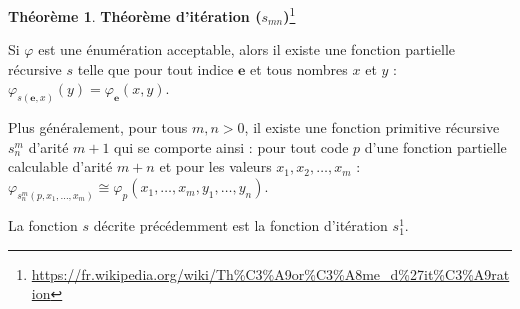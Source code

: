 \documentclass{book}
\theoremstyle{definition}
\newtheorem{theorem}{Théorème}
\numberwithin{lemma}{subsection}
\numberwithin{theorem}{subsection}
\numberwithin{definition}{subsection}
\numberwithin{proposition}{subsection}
\numberwithin{corollary}{subsection}
\numberwithin{property}{subsection}
\numberwithin{example}{subsection}
\numberwithin{heuristique}{subsection}
\numberwithin{scenario}{subsection}
\begin{document}
            \begin{theorem}\textbf{Théorème d'itération ($s_{mn}$)}\footnote{\url{https://fr.wikipedia.org/wiki/Th\%C3\%A9or\%C3\%A8me\_d\%27it\%C3\%A9ration}}\label{th:iteration}
                \par Si $\varphi$ est une énumération acceptable, alors il existe une fonction partielle récursive $s$ telle que pour tout indice $\mathbf {e}$ et tous nombres $x$ et $y$ : $\varphi_{s(\mathbf{e},x)}(y)=\varphi_{\mathbf{e}}(x,y)$.
                \par Plus généralement, pour tous $m,n > 0$, il existe une fonction primitive récursive $s^m_n$ d'arité $m+1$ qui se comporte ainsi : pour tout code $p$ d'une fonction partielle calculable d'arité $m+n$ et pour les valeurs $x_1, x_2, \dots, x_m$ : $\varphi_{s^m_n (p,x_1,\dots,x_m)} \cong \varphi_p(x_1,\dots,x_m,y_1,\dots,y_n)$.
                \par La fonction $s$ décrite précédemment est la fonction d'itération $s_1^1$.
            \end{theorem}
            
\end{document}
